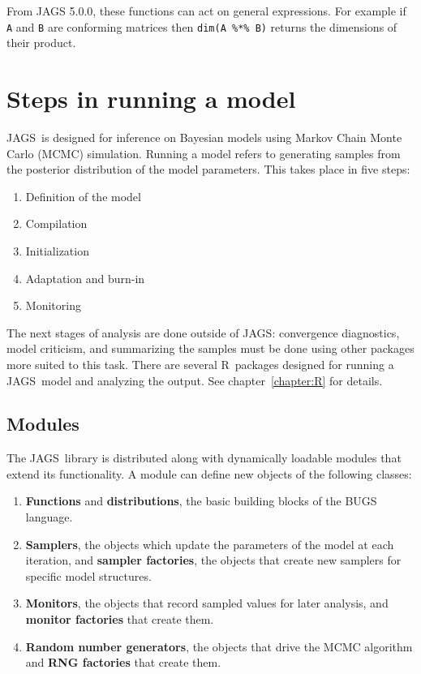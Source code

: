 \documentclass[11pt, a4paper, titlepage]{report}
\newcommand{\JAGS}{\textsf{JAGS}}
\newcommand{\R}{\textsf{R}}
\begin{document}
From JAGS 5.0.0, these functions can act on general expressions. For
example if \texttt{A} and \texttt{B} are conforming matrices then
\verb+dim(A %*% B)+ returns the dimensions of their product.

\chapter{Steps in running a model}
\label{chapter:running}

\JAGS\ is designed for inference on Bayesian models using Markov Chain
Monte Carlo (MCMC) simulation.  Running a model refers to generating
samples from the posterior distribution of the model parameters.  This
takes place in five steps:
\begin{enumerate}
\item Definition of the model
\item Compilation
\item Initialization
\item Adaptation and burn-in
\item Monitoring
\end{enumerate}
The next stages of analysis are done outside of \JAGS: convergence
diagnostics, model criticism, and summarizing the samples must be done
using other packages more suited to this task. There are several
\R\ packages designed for running a \JAGS\ model and analyzing the
output. See chapter~\ref{chapter:R} for details.

\section{Modules}
\label{section:running:modules}

The \JAGS\ library is distributed along with dynamically loadable
modules that extend its functionality.  A module can define new
objects of the following classes:
\begin{enumerate}
\item {\bf Functions} and {\bf distributions}, the basic building
blocks of the BUGS language.
\item {\bf Samplers}, the objects which update the parameters of the
model at each iteration, and {\bf sampler factories}, the objects that 
create new samplers for specific model structures.
\item {\bf Monitors}, the objects that record sampled values for
later analysis, and {\bf monitor factories} that create them. 
\item {\bf Random number generators}, the objects that drive the
MCMC algorithm and {\bf RNG factories} that create them.
\end{enumerate}
\end{document}
